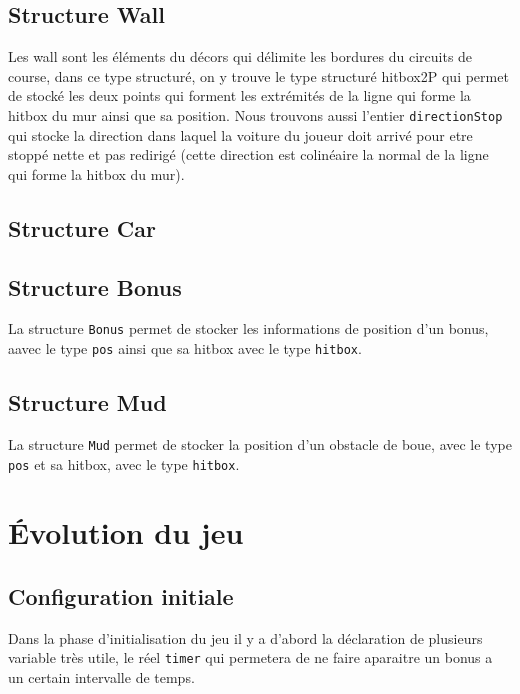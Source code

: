 \documentclass[11pt]{report}
\renewcommand{\tt}[1]{\texttt{#1}}
\begin{document}
\subsection{Structure Wall}


Les wall sont les éléments du décors qui délimite les bordures du circuits de course, dans ce type structuré, on y trouve le type structuré hitbox2P qui permet de stocké les deux points qui forment les extrémités de la ligne qui forme la hitbox du mur ainsi que sa position. Nous trouvons aussi l'entier \tt{directionStop} qui stocke la direction dans laquel la voiture du joueur doit arrivé pour etre stoppé nette et pas redirigé (cette direction est colinéaire la normal de la ligne qui forme la hitbox du mur).

\subsection{Structure Car}




\subsection{Structure Bonus}


La structure \tt{Bonus} permet de stocker les informations de position d'un bonus, aavec le type \tt{pos} ainsi que sa hitbox avec le type \tt{hitbox}.

\subsection{Structure Mud}


La structure \tt{Mud} permet de stocker la position d'un obstacle de boue, avec le type \tt{pos} et sa hitbox, avec le type \tt{hitbox}.


\section{Évolution du jeu}

\subsection{Configuration initiale}


Dans la phase d'initialisation du jeu il y a d'abord la déclaration de plusieurs variable très utile, le réel \tt{timer} qui permetera de ne faire aparaitre un bonus a un certain intervalle de temps. 
\end{document}
